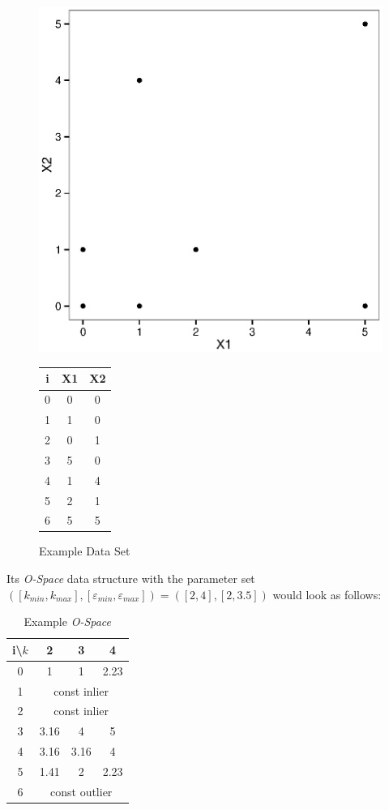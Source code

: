 \documentclass[runningheads]{llncs}
\begin{document}
\begin{figure}
\begin{minipage}[H]{.65\textwidth}
\centering
\includegraphics[width=.7\linewidth]{images/example_plot.eps}
\end{minipage}
\begin{minipage}[H]{.3\textwidth}
\centering
\begin{tabular}{ | c | c  c |}
\hline
i & X1 & X2 \\
\hline
0 & 0 & 0 \\
1 & 1 & 0 \\
2 & 0 & 1 \\
3 & 5 & 0 \\
4 & 1 & 4 \\
5 & 2 & 1 \\
6 & 5 & 5 \\
\hline
\end{tabular}
\end{minipage}
\caption{Example Data Set}
\end{figure}

Its \emph{O-Space} data structure with the parameter set $([k_{min},k_{max}],[\varepsilon_{min},\varepsilon_{max}])=([2,4],[2,3.5])$ would look as follows:

\begin{table}
\caption{Example \emph{O-Space}}
\centering
\begin{tabular} {| c | c | c | c |}
\hline
i\textbackslash$k$ & 2 & 3 & 4\\
\hline
0 & 1 & 1 & 2.23 \\
\hline
1 &\multicolumn{3}{|c|}{const inlier}\\
2 &\multicolumn{3}{|c|}{const inlier}\\
\hline
3 & 3.16 & 4 & 5 \\
4 & 3.16 & 3.16 & 4 \\
5 & 1.41 & 2 & 2.23\\
\hline
6 &\multicolumn{3}{|c|}{const outlier}\\
\hline
\end{tabular}
\end{table}
\end{document}
